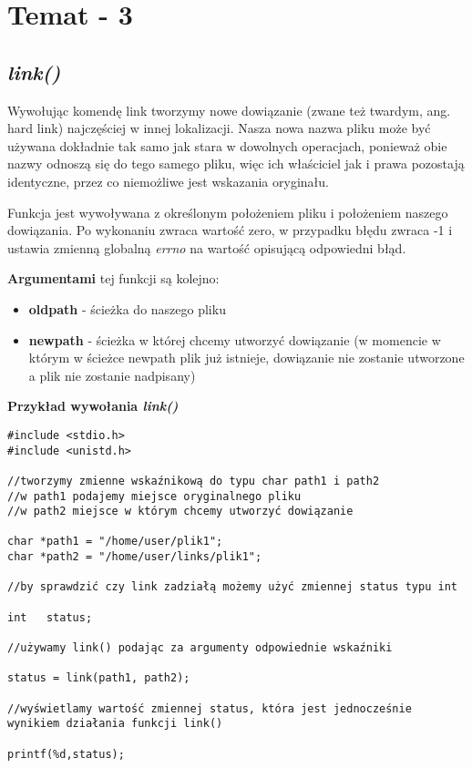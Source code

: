 \documentclass{article}
\begin{document}
  
\section{Temat - 3}
\subsection{\textit{link()}}
Wywołując komendę link tworzymy nowe dowiązanie (zwane też twardym, ang. hard link) najczęściej w innej lokalizacji. Nasza nowa nazwa pliku może być używana dokładnie tak samo jak stara w dowolnych operacjach, ponieważ obie nazwy odnoszą się do tego samego pliku, więc ich właściciel jak i prawa pozostają identyczne, przez co niemożliwe jest wskazania oryginału.

Funkcja jest wywoływana z określonym położeniem pliku i położeniem naszego dowiązania. Po wykonaniu zwraca wartość zero, w przypadku błędu zwraca -1 i ustawia zmienną globalną \textit{errno} na wartość opisującą odpowiedni błąd.


\textbf{Argumentami} tej funkcji są kolejno:
\begin{itemize}
\item \textbf{oldpath} - ścieżka do naszego pliku
\item \textbf{newpath} - ścieżka w której chcemy utworzyć dowiązanie (w momencie w którym w ścieżce newpath plik już istnieje, dowiązanie nie zostanie utworzone a plik nie zostanie nadpisany)
\end{itemize}

\textbf{Przykład wywołania \textit{link()}}

\begin{verbatim}
#include <stdio.h>
#include <unistd.h>

//tworzymy zmienne wskaźnikową do typu char path1 i path2
//w path1 podajemy miejsce oryginalnego pliku
//w path2 miejsce w którym chcemy utworzyć dowiązanie

char *path1 = "/home/user/plik1"; 
char *path2 = "/home/user/links/plik1";

//by sprawdzić czy link zadziałą możemy użyć zmiennej status typu int

int   status; 

//używamy link() podając za argumenty odpowiednie wskaźniki

status = link(path1, path2);

//wyświetlamy wartość zmiennej status, która jest jednocześnie wynikiem działania funkcji link()

printf(%d,status);

\end{verbatim}
\end{document}
